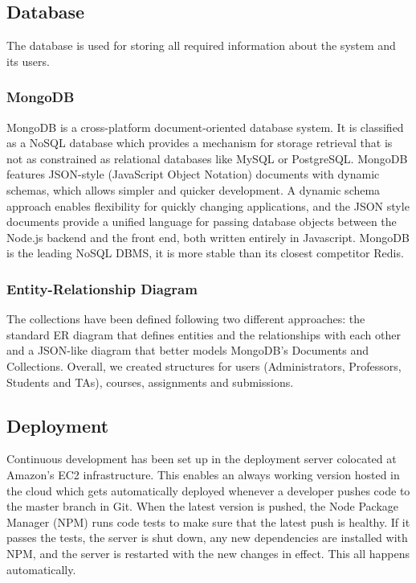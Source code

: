 \subsection{Database}

The database is used for storing all required information about the system and
its users.

\subsubsection{MongoDB}

MongoDB is a cross-platform document-oriented database system. It is classified
as a NoSQL database which provides a mechanism for storage retrieval that is not
as constrained as relational databases like MySQL or PostgreSQL. MongoDB
features JSON-style (JavaScript Object Notation) documents with dynamic schemas,
which allows simpler and quicker development. A dynamic schema approach enables
flexibility for quickly changing applications, and the JSON style documents
provide a unified language for passing database objects between the Node.js
backend and the front end, both written entirely in Javascript. MongoDB is the
leading NoSQL DBMS, it is more stable than its closest competitor Redis.

\subsubsection{Entity-Relationship Diagram}

The collections have been defined following two different approaches: the
standard ER diagram that defines entities and the relationships with each other
and a JSON-like diagram that better models MongoDB's Documents and Collections.
Overall, we created structures for users (Administrators, Professors, Students
and TAs), courses, assignments and submissions.




\subsection{Deployment}

Continuous development has been set up in the deployment server colocated at
Amazon's EC2 infrastructure. This enables an always working version hosted in
the cloud which gets automatically deployed whenever a developer pushes code to
the master branch in Git. When the latest version is pushed, the Node Package
Manager (NPM) runs code tests to make sure that the latest push is healthy. If
it passes the tests, the server is shut down, any new dependencies are installed
with NPM, and the server is restarted with the new changes in effect. This all
happens automatically.

